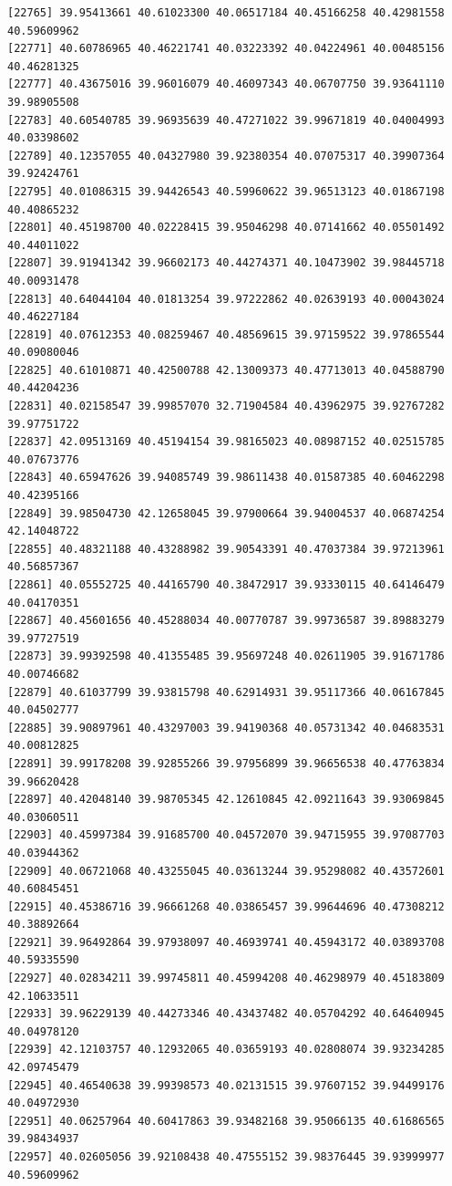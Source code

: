 \documentclass[
  letterpaper,
  DIV=11,
  numbers=noendperiod]{scrartcl}
\begin{document}
\begin{verbatim}
[22765] 39.95413661 40.61023300 40.06517184 40.45166258 40.42981558 40.59609962
[22771] 40.60786965 40.46221741 40.03223392 40.04224961 40.00485156 40.46281325
[22777] 40.43675016 39.96016079 40.46097343 40.06707750 39.93641110 39.98905508
[22783] 40.60540785 39.96935639 40.47271022 39.99671819 40.04004993 40.03398602
[22789] 40.12357055 40.04327980 39.92380354 40.07075317 40.39907364 39.92424761
[22795] 40.01086315 39.94426543 40.59960622 39.96513123 40.01867198 40.40865232
[22801] 40.45198700 40.02228415 39.95046298 40.07141662 40.05501492 40.44011022
[22807] 39.91941342 39.96602173 40.44274371 40.10473902 39.98445718 40.00931478
[22813] 40.64044104 40.01813254 39.97222862 40.02639193 40.00043024 40.46227184
[22819] 40.07612353 40.08259467 40.48569615 39.97159522 39.97865544 40.09080046
[22825] 40.61010871 40.42500788 42.13009373 40.47713013 40.04588790 40.44204236
[22831] 40.02158547 39.99857070 32.71904584 40.43962975 39.92767282 39.97751722
[22837] 42.09513169 40.45194154 39.98165023 40.08987152 40.02515785 40.07673776
[22843] 40.65947626 39.94085749 39.98611438 40.01587385 40.60462298 40.42395166
[22849] 39.98504730 42.12658045 39.97900664 39.94004537 40.06874254 42.14048722
[22855] 40.48321188 40.43288982 39.90543391 40.47037384 39.97213961 40.56857367
[22861] 40.05552725 40.44165790 40.38472917 39.93330115 40.64146479 40.04170351
[22867] 40.45601656 40.45288034 40.00770787 39.99736587 39.89883279 39.97727519
[22873] 39.99392598 40.41355485 39.95697248 40.02611905 39.91671786 40.00746682
[22879] 40.61037799 39.93815798 40.62914931 39.95117366 40.06167845 40.04502777
[22885] 39.90897961 40.43297003 39.94190368 40.05731342 40.04683531 40.00812825
[22891] 39.99178208 39.92855266 39.97956899 39.96656538 40.47763834 39.96620428
[22897] 40.42048140 39.98705345 42.12610845 42.09211643 39.93069845 40.03060511
[22903] 40.45997384 39.91685700 40.04572070 39.94715955 39.97087703 40.03944362
[22909] 40.06721068 40.43255045 40.03613244 39.95298082 40.43572601 40.60845451
[22915] 40.45386716 39.96661268 40.03865457 39.99644696 40.47308212 40.38892664
[22921] 39.96492864 39.97938097 40.46939741 40.45943172 40.03893708 40.59335590
[22927] 40.02834211 39.99745811 40.45994208 40.46298979 40.45183809 42.10633511
[22933] 39.96229139 40.44273346 40.43437482 40.05704292 40.64640945 40.04978120
[22939] 42.12103757 40.12932065 40.03659193 40.02808074 39.93234285 42.09745479
[22945] 40.46540638 39.99398573 40.02131515 39.97607152 39.94499176 40.04972930
[22951] 40.06257964 40.60417863 39.93482168 39.95066135 40.61686565 39.98434937
[22957] 40.02605056 39.92108438 40.47555152 39.98376445 39.93999977 40.59609962

\end{verbatim}
\end{document}
